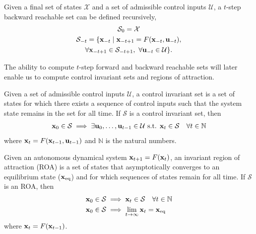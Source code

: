 \begin{definition}
    Given a final set of states $\mathcal{X}$ and a set of admissible control inputs $\mathcal{U}$, a $t$-step backward reachable set can be defined recursively,
    \begin{gather*}
    \mathcal{S}_0 = \mathcal{X} \\
        \mathcal{S}_{-t} = \{\mathbf{x}_{-t} \mid \mathbf{x}_{-t+1} = F(\mathbf{x}_{-t}, \mathbf{u}_{-t}),\\ \forall \mathbf{x}_{-t+1} \in \mathcal{S}_{-t+1},\ \forall \mathbf{u}_{-t} \in \mathcal{U}\}.
    \end{gather*}
\end{definition}

The ability to compute $t$-step forward and backward reachable sets will later enable us to compute control invariant sets and regions of attraction.
\begin{definition}
    Given a set of admissible control inputs $\mathcal{U}$, a control invariant set is a set of states for which there exists a sequence of control inputs such that the system state remains in the set for all time.
    If $\mathcal{S}$ is a control invariant set, then 
    \begin{gather*}
        \mathbf{x}_0 \in \mathcal{S} \implies \exists \mathbf{u}_0, \ldots, \mathbf{u}_{t-1} \in \mathcal{U} \text{  s.t.  } \mathbf{x}_t \in \mathcal{S} \quad \forall t \in \mathbb{N}
    \end{gather*}
    where $\mathbf{x}_t = F(\mathbf{x}_{t-1}, \mathbf{u}_{t-1})$ and $\mathbb{N}$ is the natural numbers.
\end{definition}

\begin{definition}
    Given an autonomous dynamical system $\mathbf{x}_{t+1} = F(\mathbf{x}_t)$, an invariant region of attraction (ROA) is a set of states that asymptotically converges to an equilibrium state ($\mathbf{x}_{\text{eq}}$) and for which sequences of states remain for all time. 
    If $\mathcal{S}$ is an ROA, then
    \begin{align*}
        \mathbf{x}_0 \in \mathcal{S} &\implies \mathbf{x}_t \in \mathcal{S} \quad \forall t \in \mathbb{N} \\
        \mathbf{x}_0 \in \mathcal{S} &\implies \lim_{t \rightarrow \infty} \mathbf{x}_t = \mathbf{x}_{\text{eq}}
    \end{align*}
    where $\mathbf{x}_t = F(\mathbf{x}_{t-1})$.
\end{definition}

